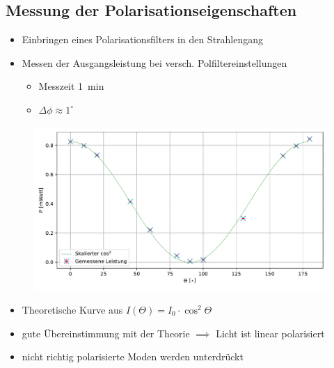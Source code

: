 \documentclass[10pt, aspectratio=169]{beamer}
\begin{document}
\subsection{Messung der Polarisationseigenschaften}
\begin{frame}
  \begin{itemize}
  \item<1-> Einbringen eines Polarisationsfilters in den Strahlengang
  \item<2-> Messen der Ausgangsleistung bei
    versch. Polfiltereinstellungen
    \begin{itemize}
    \item Messzeit \SI{1}{\minute}
    \item \(\Delta\phi \approx 1^\circ\)
    \end{itemize}
  \end{itemize}
\end{frame}

\begin{frame}
  \begin{figure}[b]\centering
    \includegraphics[width=.8\columnwidth]{figs/malus.pdf}
  \end{figure}
  \begin{itemize}
  \item<1-> Theoretische Kurve aus
    \(I(\Theta)=I_0\cdot \cos^2{\Theta}\)
  \item<2-> gute Übereinstimmung mit der Theorie \(\implies\) Licht
    ist linear polarisiert
  \item<3-> nicht richtig polarisierte Moden werden unterdr\"uckt
  \end{itemize}
\end{frame}
\end{document}
